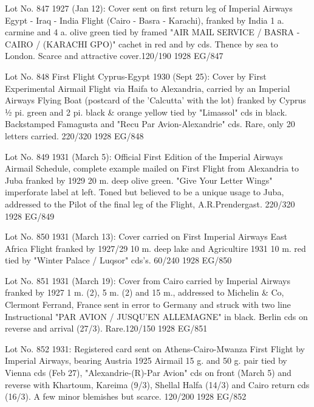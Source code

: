 \documentclass[justified]{tufte-book}
\begin{document}
%
{Lot No. 847
1927 (Jan 12): Cover sent on first return leg of Imperial Airways Egypt - Iraq - India Flight (Cairo - Basra - Karachi), franked by India 1 a. carmine and 4 a. olive green tied by framed "AIR MAIL SERVICE / BASRA - CAIRO / (KARACHI GPO)" cachet in red and by cds. Thence by sea to London. Scarce and attractive cover.120/190}%
{1928}%
{EG/847}%
{}%
{}
{}%
{}

%
{Lot No. 848
First Flight Cyprus-Egypt 1930 (Sept 25): Cover by First Experimental Airmail Flight via Haifa to Alexandria, carried by an Imperial Airways Flying Boat (postcard of the 'Calcutta' with the lot) franked by Cyprus ½ pi. green and 2 pi. black \& orange yellow tied by "Limassol" cds in black. Backstamped Famagusta and "Recu Par Avion-Alexandrie" cds. Rare, only 20 letters carried. 220/320}%
{1928}%
{EG/848}%
{}%
{}
{}%
{}


%
{Lot No. 849
1931 (March 5): Official First Edition of the Imperial Airways Airmail Schedule, complete example mailed on First Flight from Alexandria to Juba franked by 1929 20 m. deep olive green. "Give Your Letter Wings" imperforate label at left. Toned but believed to be a unique usage to Juba, addressed to the Pilot of the final leg of the Flight, A.R.Prendergast. 220/320}%
{1928}%
{EG/849}%
{}%
{}
{}%
{}

%
{Lot No. 850
1931 (March 13): Cover carried on First Imperial Airways East Africa Flight franked by 1927/29 10 m. deep lake and Agricultire 1931 10 m. red tied by "Winter Palace / Luqsor" cds's. 60/240}%
{1928}%
{EG/850}%
{}%
{}
{}%
{}


%
{Lot No. 851
1931 (March 19): Cover from Cairo carried by Imperial Airways franked by 1927 1 m. (2), 5 m. (2) and 15 m., addressed to Michelin \& Co, Clermont Ferrand, France sent in error to Germany and struck with two line Instructional "PAR AVION / JUSQU'EN ALLEMAGNE" in black. Berlin cds on reverse and arrival (27/3). Rare.120/150}%
{1928}%
{EG/851}%
{}%
{}
{}%
{}


%
{
Lot No. 852
1931: Registered card sent on Athens-Cairo-Mwanza First Flight by Imperial Airways, bearing Austria 1925 Airmail 15 g. and 50 g. pair tied by Vienna cds (Feb 27), "Alexandrie-(R)-Par Avion" cds on front (March 5) and reverse with Khartoum, Kareima (9/3), Shellal Halfa (14/3) and Cairo return cds (16/3). A few minor blemishes but scarce. 120/200}%
{1928}%
{EG/852}%
{}%
{}
{}%
{}
\end{document}
